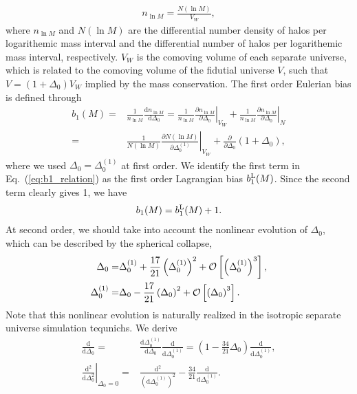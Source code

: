 \documentclass[a4paper,11pt]{article}
\renewcommand{\d}{\mathrm{d}}
\begin{document}
\begin{align}
n_{\ln{M}} = \frac{N(\ln{M})}{V_W},
\end{align}
where $n_{\ln{M}}$ and $N(\ln{M})$ are the differential number density of halos per logarithemic mass interval and
the differential number of halos per logarithemic mass interval, respectively.
$V_W$ is the comoving volume of each separate universe, which is related to the comoving volume of the  fidutial universe $V$, such that $V = (1+\Delta_0) V_W$ implied by the mass conservation.
The first order Eulerian bias is defined through
\begin{align}
b_{1}(M) =& \frac{1}{n_{\ln{M}}}
\frac{\d n_{\ln{M}}}{\d \Delta_0}
=\frac{1}{n_{\ln{M}}} \left.\frac{\partial n_{\ln{M}}}{\partial\Delta_0}\right|_{V_W}
+ \frac{1}{n_{\ln{M}}}\left.\frac{\partial n_{\ln{M}}}{\partial \Delta_0}\right|_{N}
\\
=& \frac{1}{N(\ln{M})}
\left.\frac{\partial N(\ln{M})}{\partial \Delta^{(1)}_0}\right|_{V_W}
+\frac{\partial}{\partial \Delta_0}\left(1+\Delta_0\right),
\label{eq:b1_relation}
\end{align}
where we used $\Delta_0 = \Delta_0^{(1)}$ at first order.
We identify the first term in Eq.~(\ref{eq:b1_relation}) as
the first order Lagrangian bias $b_1^{\rm L}(M)$.
Since the second term clearly gives 1, we have
\begin{align}
b_1(M) = b_1^{\rm L}(M) + 1.
\end{align}
At second order, we should take into account
the nonlinear evolution of $\Delta_0$,
which can be described by the spherical collapse,
\begin{align}
\Delta_0 =& \Delta_0^{(1)} + \frac{17}{21}\left(\Delta_0^{(1)}\right)^2 + {\cal O}\left[
\left(\Delta^{(1)}_0\right)^3\right],
\\
\Delta_0^{(1)} =& \Delta_0 - \frac{17}{21}\left(\Delta_0\right)^2
+ {\cal O}\left[ \left(\Delta_0\right)^3\right].
\end{align}
Note that this nonlinear evolution is naturally realized in the isotropic separate universe simulation tequnichs.
We derive
\begin{align}
\frac{\d}{\d \Delta_0}
=&
\frac{\d \Delta_0^{(1)} }{\d \Delta_0}\frac{\d }{\d \Delta_0^{(1)}}
=\left( 1 - \frac{34}{21}\Delta_0 \right)\frac{\d }{\d \Delta_0^{(1)}},
\\
\left. \frac{\d^2}{\d \Delta_0^2}\right|_{\Delta_0=0}
=& \frac{\d^2}{\left(\d \Delta_0^{(1)}\right)^2}
-\frac{34}{21}\frac{\d }{\d \Delta_0^{(1)}}.
\end{align}
\end{document}
